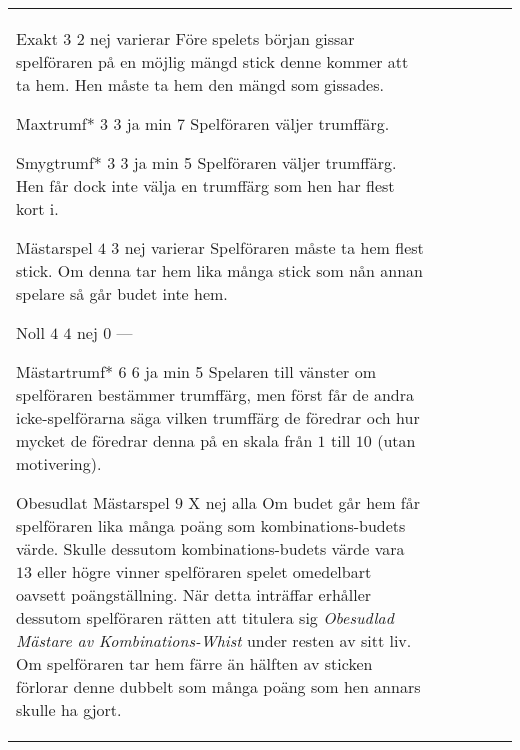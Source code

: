 \begin{table}
\begin{center}
\begin{tabularx}{\textwidth}{lcccc|X}
				\standardBidItem%
				{Exakt}
				{$3$}
				{$2$}
				{nej}
				{varierar}
				{%
					Före spelets början gissar spelföraren på en möjlig mängd stick denne kommer att ta hem. Hen måste ta hem den mängd som gissades.
				}

				\standardBidItem%
				{Maxtrumf*}
				{$3$}
				{$3$}
				{ja}
				{min 7}
				{%
					Spelföraren väljer trumffärg.
				}

				\standardBidItem%
				{Smygtrumf*}
				{$3$}
				{$3$}
				{ja}
				{min 5}
				{%
					Spelföraren väljer trumffärg. Hen får dock inte välja en trumffärg som hen har flest kort i.
				}

				\standardBidItem%
				{Mästarspel}
				{$4$}
				{$3$}
				{nej}
				{varierar}
				{%
					Spelföraren måste ta hem flest stick. Om denna tar hem lika många stick som nån annan spelare så går budet inte hem.
				}

				\standardBidItem%
				{Noll}
				{$4$}
				{$4$}
				{nej}
				{0}
				{%
					---
				}

				\standardBidItem%
				{Mästartrumf*}
				{$6$}
				{$6$}
				{ja}
				{min 5}
				{%
					Spelaren till vänster om spelföraren bestämmer trumffärg, men först får de andra icke-spelförarna säga vilken trumffärg de föredrar och hur mycket de föredrar denna på en skala från $1$ till $10$ (utan motivering).
				}

				\standardBidItem%
				{Obesudlat Mästarspel}
				{$9$}
				{X}
				{nej}
				{alla}
				{%
					Om budet går hem får spelföraren lika många poäng som kombinations-budets värde. Skulle dessutom kombinations-budets värde vara $13$ eller högre vinner spelföraren spelet omedelbart oavsett poängställning. När detta inträffar erhåller dessutom spelföraren rätten att titulera sig \emph{Obesudlad Mästare av Kombinations-Whist} under resten av sitt liv. Om spelföraren tar hem färre än hälften av sticken förlorar denne dubbelt som många poäng som hen annars skulle ha gjort.
				}
		\end{tabularx}
	\end{center}
\end{table}
